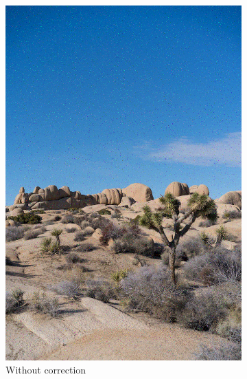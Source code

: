 \documentclass{article}
\begin{document}
\begin{figure}[htb]
\begin{subfigure}[b]{0.32\textwidth}
        \includegraphics[width=\textwidth]{../Result/Cyclic/15-11/cyclic-bsc-output.png}
        \caption{Without correction}
        \label{fig:image-cyclic-bsc-no-correction}
    \end{subfigure}
    \hfill
    \begin{subfigure}[b]{0.32\textwidth}
        \centering

\end{subfigure}
\end{figure}
\end{document}

